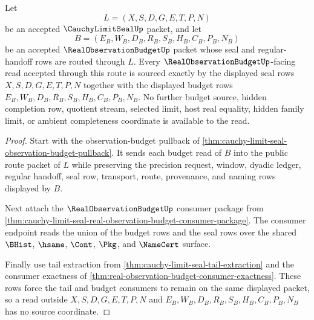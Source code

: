 \begin{theorem}
\label{thm:cauchy-limit-seal-budget-root-source-totality}
Let
$$
L=(X,S,D,G,E,T,P,N)
$$
be an accepted $\CauchyLimitSealUp$ packet, and let
$$
B=(E_B,W_B,D_B,R_B,S_B,H_B,C_B,P_B,N_B)
$$
be an accepted $\RealObservationBudgetUp$ packet whose seal and regular-handoff rows are routed through $L$. Every $\RealObservationBudgetUp$-facing read accepted through this route is sourced exactly by the displayed seal rows $X,S,D,G,E,T,P,N$ together with the displayed budget rows $E_B,W_B,D_B,R_B,S_B,H_B,C_B,P_B,N_B$. No further budget source, hidden completion row, quotient stream, selected limit, host real equality, hidden family limit, or ambient completeness coordinate is available to the read.
\end{theorem}
\begin{proof}
Start with the observation-budget pullback of \autoref{thm:cauchy-limit-seal-observation-budget-pullback}. It sends each budget read of $B$ into the public route packet of $L$ while preserving the precision request, window, dyadic ledger, regular handoff, seal row, transport, route, provenance, and naming rows displayed by $B$.

Next attach the $\RealObservationBudgetUp$ consumer package from \autoref{thm:cauchy-limit-seal-real-observation-budget-consumer-package}. The consumer endpoint reads the union of the budget rows and the seal rows over the shared $\BHist$, $\hsame$, $\Cont$, $\Pkg$, and $\NameCert$ surface.

Finally use tail extraction from \autoref{thm:cauchy-limit-seal-tail-extraction} and the consumer exactness of \autoref{thm:real-observation-budget-consumer-exactness}. These rows force the tail and budget consumers to remain on the same displayed packet, so a read outside $X,S,D,G,E,T,P,N$ and $E_B,W_B,D_B,R_B,S_B,H_B,C_B,P_B,N_B$ has no source coordinate.
\end{proof}

